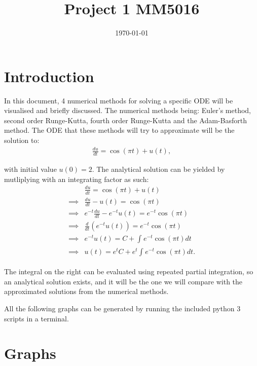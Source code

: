 \documentclass[10pt]{article}
\date{\today}
\title{Project 1 MM5016}
\begin{document}
\maketitle

\section{Introduction}
\label{sec:org82166b2}
In this document, 4 numerical methods for solving a specific ODE
will be visualised and briefly discussed. The numerical methods being:
Euler's method, second order Runge-Kutta, fourth order Runge-Kutta and the
Adam-Basforth method. The ODE that these methods will try to approximate will
be the solution to:
\begin{align*}
\frac{du}{dt} = \cos(\pi t) + u(t)
,
\end{align*}

with initial value \(u(0) = 2\). The analytical solution can
be yielded by mutliplying with an integrating factor as such:
\begin{align*}
 &  \frac{du}{dt} = \cos (\pi t) + u(t) \\
\implies & \frac{du}{dt} - u(t) = \cos(\pi t) \\
\implies & e^{-t} \frac{du}{dt} - e^{-t} u(t) = e^{-t} \cos(\pi t) \\
\implies & \frac{d}{dt} ( e^{-t} u (t)) = e^{-t} \cos( \pi t ) \\
\implies & e^{-t} u(t) = C + \int_{  } e^{-t} \cos (\pi t) dt \\
\implies & u(t) = e^{t} C + e^{t} \int_{  } e^{-t} \cos (\pi t) dt 
.
\end{align*}

The integral on the right can be evaluated using repeated partial integration,
so an analytical solution exists, and it will be the one we will compare with
the approximated solutions from the numerical methods.


All the following graphs can be generated by running the included python 3 scripts in a terminal.
\newpage
\section{Graphs}
\label{sec:orgb8ee4e1}
\end{document}
